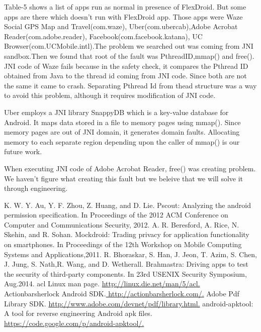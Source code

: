 \documentclass[11pt]{report}
\begin{document}
\par Table-5 shows a list of apps run as normal in presence of FlexDroid. But some apps are there which doesn’t run with FlexDroid app. Those apps were 
Waze Social GPS Map and Travel(com.waze), Uber(com.ubercab),Adobe Acrobat Reader(com.adobe.reader), Facebook(com.facebook.katana), UC Browser(com.UCMobile.intl).The problem we 
searched out was coming from JNI sandbox.Then we found that root of the fault was PthreadID,mmap() and free(). JNI code of Waze fails because in the safety check, it compares the 
Pthread ID obtained from Java to the thread id coming from JNI code. Since both are not the same it came to crash. Separating Pthread Id from thead structure was a way to avoid 
this problem, although it requires modification of JNI code.
\par Uber employs a JNI library SnappyDB which is a key-value database for Android. It maps data stored in a file to memory pages using mmap(). 
Since memory pages are out of JNI domain, it generates domain faults.
Allocating memory to each separate region depending upon the caller of mmap() is our future work.
\par When executing JNI code of Adobe Acrobat Reader, free() was creating problem. We haven’t figure what creating this fault but we beleive that we will solve it through 
engineering.



\begin{thebibliography}{100} %
\addtolength{\leftmargin}{0.2in} %
\setlength{\itemindent}{-0.2in}
 K. W. Y. Au, Y. F. Zhou, Z. Huang, and D. Lie. Pscout: Analyzing the android permission specification. In Proceedings of the 2012 ACM Conference on Computer and Communications Security, 2012.
 A. R. Beresford, A. Rice, N. Skehin, and R. Sohan. Mockdroid: Trading privacy for application functionality on smartphones. In Proceedings of the 12th Workshop on Mobile Computing Systems and Applications,2011.
 R. Bhoraskar, S. Han, J. Jeon, T. Azim, S. Chen, J. Jung, S. Nath,R. Wang, and D. Wetherall. Brahmastra: Driving apps to test the security of third-party components. In 23rd USENIX Security Symposium, Aug.2014.
 acl Linux man page. \url{http://linux.die.net/man/5/acl.}
 Actionbarsherlock Android SDK.\url{ http://actionbarsherlock.com/.}
 Adobe Pdf Library SDK. \url{http://www.adobe.com/devnet/pdf/library.html.}
 android-apktool: A tool for reverse engineering Android apk files. \url{https://code.google.com/p/android-apktool/.}


\end{thebibliography}
\end{document}
